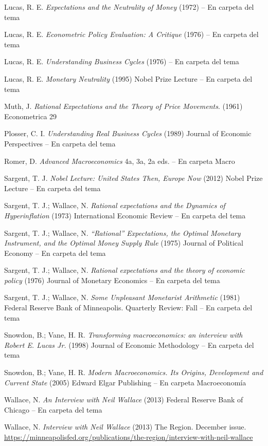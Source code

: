 \documentclass{nuevotema}
\begin{document}
Lucas, R. E. \textit{Expectations and the Neutrality of Money} (1972) -- En carpeta del tema

Lucas, R. E. \textit{Econometric Policy Evaluation: A Critique} (1976) -- En carpeta del tema

Lucas, R. E. \textit{Understanding Business Cycles} (1976) -- En carpeta del tema

Lucas, R. E. \textit{Monetary Neutrality} (1995) Nobel Prize Lecture -- En carpeta del tema

Muth, J. \textit{Rational Expectations and the Theory of Price Movements}. (1961) Econometrica 29 

Plosser, C. I. \textit{Understanding Real Business Cycles} (1989) Journal of Economic Perspectives -- En carpeta del tema

Romer, D. \textit{Advanced Macroeconomics} 4a, 3a, 2a eds. -- En carpeta Macro

Sargent, T. J. \textit{Nobel Lecture: United States Then, Europe Now} (2012) Nobel Prize Lecture -- En carpeta del tema

Sargent, T. J.; Wallace, N. \textit{Rational expectations and the Dynamics of Hyperinflation} (1973) International Economic Review -- En carpeta del tema

Sargent, T. J.; Wallace, N. \textit{``Rational'' Expectations, the Optimal Monetary Instrument, and the Optimal Money Supply Rule} (1975) Journal of Political Economy -- En carpeta del tema

Sargent, T. J.; Wallace, N. \textit{Rational expectations and the theory of economic policy} (1976) Journal of Monetary Economics -- En carpeta del tema

Sargent, T. J.; Wallace, N. \textit{Some Unpleasant Monetarist Arithmetic} (1981) Federal Reserve Bank of Minneapolis. Quarterly Review: Fall -- En carpeta del tema

Snowdon, B.; Vane, H. R. \textit{Transforming macroeconomics: an interview with Robert E. Lucas Jr.} (1998) Journal of Economic Methodology -- En carpeta del tema

Snowdon, B.; Vane, H. R. \textit{Modern Macroeconomics. Its Origins, Development and Current State} (2005) Edward Elgar Publishing --  En carpeta Macroeconomía

Wallace, N. \textit{An Interview with Neil Wallace} (2013) Federal Reserve Bank of Chicago -- En carpeta del tema

Wallace, N. \textit{Interview with Neil Wallace} (2013) The Region. December issue. \url{https://minneapolisfed.org/publications/the-region/interview-with-neil-wallace}
\end{document}
